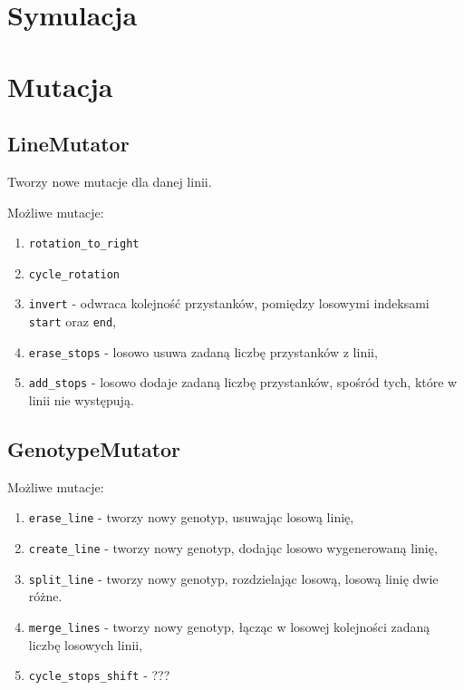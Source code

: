 \documentclass[12pt,a4paper,openright]{mwrep}
\begin{document}
\section{Symulacja}


\section{Mutacja}

\subsection{LineMutator}
Tworzy nowe mutacje dla danej linii.

Możliwe mutacje:

\begin{enumerate}
    \item \lstinline{rotation_to_right}
    \item \lstinline{cycle_rotation}
    \item \lstinline{invert} - odwraca kolejność przystanków, pomiędzy losowymi indeksami \lstinline{start} oraz \lstinline{end},
    \item \lstinline{erase_stops} - losowo usuwa zadaną liczbę przystanków z linii,
    \item \lstinline{add_stops} - losowo dodaje zadaną liczbę przystanków, spośród tych, które w linii nie występują.
\end{enumerate}

\subsection{GenotypeMutator}

Możliwe mutacje:

\begin{enumerate}
    \item \lstinline{erase_line} - tworzy nowy genotyp, usuwając losową linię,
    \item \lstinline{create_line} - tworzy nowy genotyp, dodając losowo wygenerowaną linię,
    \item \lstinline{split_line} - tworzy nowy genotyp, rozdzielając losową, losową linię dwie różne.
    \item \lstinline{merge_lines} - tworzy nowy genotyp, łącząc w losowej kolejności zadaną liczbę losowych linii,
    \item \lstinline{cycle_stops_shift} - ???
\end{enumerate}
\end{document}
